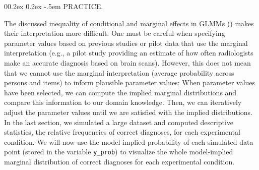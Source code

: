 \documentclass[
  man,
  floatsintext,
  longtable,
  a4paper,
  nolmodern,
  notxfonts,
  notimes,
  colorlinks=true,linkcolor=blue,citecolor=blue,urlcolor=blue]{apa7}
\makeatletter
\renewcommand{\paragraph}{\@startsection{paragraph}{4}{\parindent}%
	{0\baselineskip \@plus 0.2ex \@minus 0.2ex}%
	{-.5em}%
	{\normalfont\normalsize\bfseries\typesectitle}}
\makeatother
\begin{document}
\paragraph{PRACTICE.}\label{practice-4}

The discussed inequality of conditional and marginal effects in GLMMs
() makes their interpretation more difficult. One must be careful
when specifying parameter values based on previous studies or pilot data
that use the marginal interpretation (e.g., a pilot study providing an
estimate of how often radiologists make an accurate diagnosis based on
brain scans). However, this does not mean that we cannot use the
marginal interpretation (average probability across persons and items)
to inform plausible parameter values: When parameter values have been
selected, we can compute the implied marginal distributions and compare
this information to our domain knowledge. Then, we can iteratively
adjust the parameter values until we are satisfied with the implied
distributions. In the last section, we simulated a large dataset and
computed descriptive statistics, the relative frequencies of correct
diagnoses, for each experimental condition. We will now use the
model-implied probability of each simulated data point (stored in the
variable \texttt{y\_prob}) to visualize the whole model-implied marginal
distribution of correct diagnoses for each experimental condition.
\end{document}
